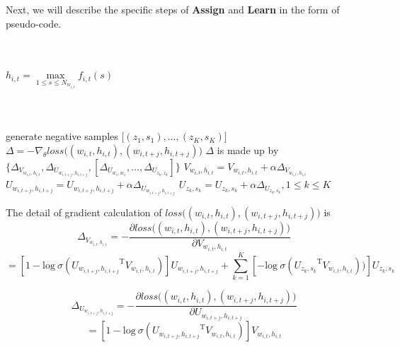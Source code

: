 Next, we will describe the specific steps of \textbf{Assign} and \textbf{Learn} in the form of pseudo-code.

\subparagraph{}\

\begin{algorithmic}
	 
  \Repeat 
   
\State $h_{i,t} = \max\limits_{1\leq s\leq N_{w_{i,t}}} f_{i,t}(s)$ 
  \EndFor
	\EndFor
\EndProcedure
	
\end{algorithmic}

\subparagraph{}\

\begin{algorithmic}
 
	  
        				\State generate negative samples $\big [(z_1,s_1),\ldots,(z_K,s_K)\big ]$
        				\State $\Delta = -\nabla_\theta loss\big ( (w_{i,t},h_{i,t}),(w_{i,t+j},h_{i,t+j})\big )$
        				\State $\Delta$ is made up by $ \{\Delta_{V_{w_{i,t},h_{i,t}}}, \Delta_{U_{w_{i,t+j},h_{i,t+j}}}, [\Delta_{U_{w_1,w_1}},\ldots,\Delta_{U_{z_k,z_k}}]\}$
        				\State $V_{w_{i,t},h_{i,t}} = V_{w_{i,t},h_{i,t}} + \alpha \Delta_{V_{w_{i,t},h_{i,t}}}$
        				\State $U_{w_{i,t+j},h_{i,t+j}} = U_{w_{i,t+j},h_{i,t+j}} + \alpha \Delta_{U_{w_{i,t+j},h_{i,t+j}}}$ 
        				\State $U_{z_k,s_k} = U_{z_k,s_k} + \alpha \Delta_{U_{z_k,s_k}}, 1\leq k\leq K$ 
    				\EndIf
		\EndFor
	\EndFor			
\EndFor			
\EndProcedure
\end{algorithmic}			



The detail of gradient calculation of $loss\big ( (w_{i,t},h_{i,t}),(w_{i,t+j},h_{i,t+j})\big )$ is
$$\Delta_{V_{w_{i,t},h_{i,t}}} = -\frac{\partial loss\big ( (w_{i,t},h_{i,t}),(w_{i,t+j},h_{i,t+j})\big )}{\partial V_{w_{i,t},h_{i,t}}} $$
$$= [1-\mathrm{log}\ \sigma({U_{w_{i,t+j},h_{i,t+j}}}^{\mathrm{T}}V_{w_{i,t},h_{i,t}})]
U_{w_{i,t+j},h_{i,t+j}}+\sum_{k=1}^K [-\mathrm{log}\ \sigma({U_{z_k,s_k}}^{\mathrm{T}}V_{w_{i,t},h_{i,t}}))]U_{z_k,s_k}$$

$$\Delta_{U_{w_{i,t+j},h_{i,t+j}}} = -\frac{\partial loss\big ( (w_{i,t},h_{i,t}),(w_{i,t+j},h_{i,t+j})\big )}{\partial U_{w_{i,t+j},h_{i,t+j}}}$$
$$=[1-\mathrm{log}\ \sigma({U_{w_{i,t+j},h_{i,t+j}}}^{\mathrm{T}}V_{w_{i,t},h_{i,t}})]
V_{w_{i,t},h_{i,t}}$$


